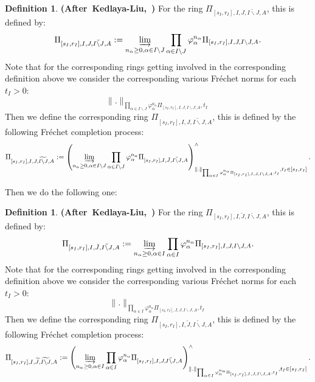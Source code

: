 \documentclass[12pt]{amsart}
\theoremstyle{definition}
\newtheorem{definition}[theorem]{Definition}
\numberwithin{equation}{section}
\begin{document}
\begin{definition}\mbox{\bf{(After Kedlaya-Liu, \cite[Definition 5.2.1]{KL2})}}
For the ring $\Pi_{[s_I,r_I],I,{J},\breve{I\backslash J},A}$, this is defined by:
\begin{align}
\Pi_{[s_I,r_I],I,{J},\breve{I\backslash J},A}:=\varinjlim_{n_\alpha\geq 0,\alpha  \in I\backslash J}\prod_{\alpha\in I\backslash J}\varphi_\alpha^{n_\alpha}\Pi_{[s_I,r_I],I,{J},I\backslash J,A}.
\end{align}
Note that for the corresponding rings getting involved in the corresponding definition above we consider the corresponding various Fr\'echet norms for each $t_I>0$:
\begin{displaymath}
\|.\|_{\prod_{\alpha\in I\backslash J}\varphi_\alpha^{n_\alpha}\Pi_{[s_I,r_I],I,{J},I\backslash J,A},t_I}	
\end{displaymath}
Then we define the corresponding ring $\Pi_{[s_I,r_I],I,{J},\widetilde{I\backslash J},A}$, this is defined by the following Fr\'echet completion process:
\begin{align}
\Pi_{[s_I,r_I],I,{J},\widetilde{I\backslash J},A}:=\left(\varinjlim_{n_\alpha\geq 0,\alpha  \in I\backslash J}\prod_{\alpha\in I\backslash J}\varphi_\alpha^{n_\alpha}\Pi_{[s_I,r_I],I,\breve{J},\breve{I\backslash J},A}\right)^\wedge_{\|.\|_{\prod_{\alpha\in I}\varphi_\alpha^{n_\alpha}\Pi_{[s_I,r_I],I,{J},I\backslash J,A},t_I},t_I\in [s_I,r_I]}.
\end{align}

  
\end{definition}



\indent Then we do the following one:

\begin{definition}\mbox{\bf{(After Kedlaya-Liu, \cite[Definition 5.2.1]{KL2})}}
For the ring $\Pi_{[s_I,r_I],I,\breve{J},\breve{I\backslash J},A}$, this is defined by:
\begin{align}
\Pi_{[s_I,r_I],I,\breve{J},\breve{I\backslash J},A}:=\varinjlim_{n_\alpha\geq 0,\alpha  \in I}\prod_{\alpha\in I}\varphi_\alpha^{n_\alpha}\Pi_{[s_I,r_I],I,{J},I\backslash J,A}.
\end{align}
Note that for the corresponding rings getting involved in the corresponding definition above we consider the corresponding various Fr\'echet norms for each $t_I>0$:
\begin{displaymath}
\|.\|_{\prod_{\alpha\in I}\varphi_\alpha^{n_\alpha}\Pi_{[s_I,r_I],I,{J},I\backslash J,A},t_I}	
\end{displaymath}
Then we define the corresponding ring $\Pi_{[s_I,r_I],I,\widetilde{J},\widetilde{I\backslash J},A}$, this is defined by the following Fr\'echet completion process:
\begin{align}
\Pi_{[s_I,r_I],I,\widetilde{J},\widetilde{I\backslash J},A}:=\left(\varinjlim_{n_\alpha\geq 0,\alpha  \in I}\prod_{\alpha\in I}\varphi_\alpha^{n_\alpha}\Pi_{[s_I,r_I],I,{J},\breve{I\backslash J},A}\right)^\wedge_{\|.\|_{\prod_{\alpha\in I}\varphi_\alpha^{n_\alpha}\Pi_{[s_I,r_I],I,{J},I\backslash J,A},t_I},t_I\in [s_I,r_I]}.
\end{align}

  
\end{definition}
\end{document}

